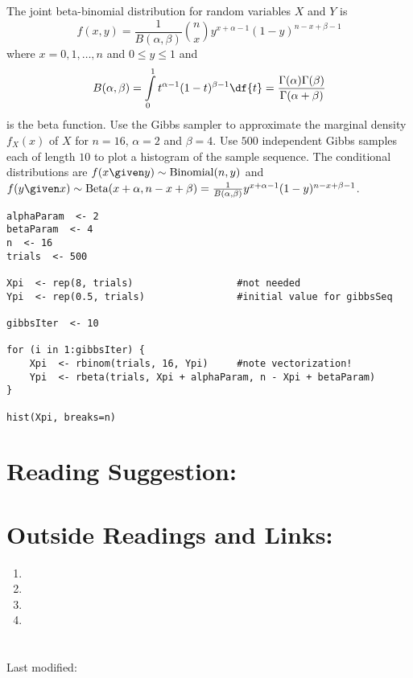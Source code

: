 \documentclass[12pt]{article}
\begin{document}
\begin{exercise}
    The joint beta-binomial distribution for random variables \( X \)
    and \( Y \) is
    \[
        f(x, y) = \frac{1}{B(\alpha, \beta)} \binom{n}{x} y^{x + \alpha
        - 1} (1-y)^{n-x+\beta-1}
    \] where \( x = 0, 1, \dots,n \) and \( 0 \le y \le 1 \) and
    \[
        B(\alpha, \beta) = \int\limits_0^1 t^{\alpha-1} (1-t)^{\beta-1}
        \df{t} = \frac{\Gamma(\alpha)\Gamma(\beta)}{\Gamma(\alpha +
        \beta)}
    \] is the beta function. Use the Gibbs sampler to approximate the
    marginal density \( f_{X}(x) \) of \( X \) for \( n = 16 \), \(
    \alpha = 2 \) and \( \beta = 4 \).  Use \( 500 \) independent Gibbs
    samples each of length \( 10 \) to plot a histogram of the sample
    sequence.  The conditional distributions are \( f(x \given y) \sim
    \operatorname{Binomial}
    (n, y) \) and \( f(y \given x) \sim \operatorname{Beta}
    (x + \alpha, n - x + \beta) = \frac{1}{B(\alpha, \beta)} y^{x +
    \alpha-1} (1-y)^{n-x+\beta-1} \).
\end{exercise}
\begin{solution}
\begin{lstlisting}
alphaParam  <- 2
betaParam  <- 4
n  <- 16
trials  <- 500

Xpi  <- rep(8, trials)                  #not needed
Ypi  <- rep(0.5, trials)                #initial value for gibbsSeq

gibbsIter  <- 10

for (i in 1:gibbsIter) {
    Xpi  <- rbinom(trials, 16, Ypi)     #note vectorization!
    Ypi  <- rbeta(trials, Xpi + alphaParam, n - Xpi + betaParam)
}

hist(Xpi, breaks=n)
\end{lstlisting}
\end{solution}

\hr

\section*{Reading Suggestion:}




\hr

\section*{Outside Readings and Links:}
\begin{enumerate}
    \item
    \item
    \item
    \item
\end{enumerate}

\section*{\solutionsname}
\loadSolutions

\hr

\mydisclaim \myfooter

Last modified:  \flastmod
\end{document}
